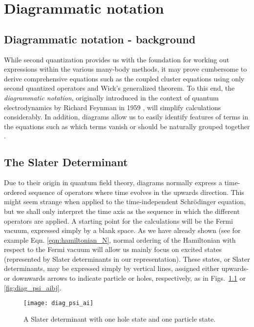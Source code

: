 
\chapter{Diagrammatic notation} %

\label{Chapter3} %



\section{Diagrammatic notation - background}

While second quantization provides us with the foundation for working
out expressions within the various many-body methods, it may prove
cumbersome to derive comprehensive equations such as the coupled
cluster equations using only second quantized operators and Wick's
generalized theorem. To this end, the \emph{diagrammatic notation},
originally introduced in the context of  quantum electrodynamics by Richard Feynman
in 1959 \cite[p.1]{ShavittBartlett2009}, will simplify calculations
considerably. In addition, diagrams allow us to easily
identify features of terms in the equations such as which terms vanish
or should be naturally grouped together \cite{ShavittBartlett2009}.

\section{The Slater Determinant}

Due to their origin in quantum field theory, diagrams normally express
a time-ordered sequence of operators where time evolves in the upwards
direction. This might seem strange when applied to the
time-independent Schrödinger equation, but we shall only interpret the
time axis as the sequence in which the different operators are
applied. A starting point for the calculations will be the Fermi
vacuum, expressed simply by a blank space. As we have already shown
(see for example Eqn. \ref{eqn:hamiltonian_N}, normal ordering of the Hamiltonian with respect to the Fermi
vacuum will allow us mainly focus on excited states (represented by
Slater determinants in our representation). These states, or Slater determinants, may be
expressed simply by vertical lines, assigned either upwards- or
downwards arrows to indicate particle or holes, respectively, as in
Figs.~\ref{fig:diag_psi_ai} or \ref{fig:diag_psi_aibj}.
\begin{figure}[hbtp]
    \centering
    \texttt{[image: diag\_psi\_ai]}
    \caption{A Slater determinant with one hole state and one particle state.}
    \label{fig:diag_psi_ai}
\end{figure}

